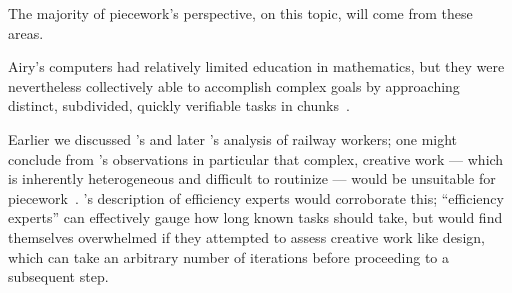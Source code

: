 \documentclass[trackingWork]{subfiles}
\begin{document}

The majority of piecework's perspective, on this topic, will come from these areas.

Airy's computers had relatively limited education in mathematics, but
they were nevertheless collectively able to accomplish complex goals by
approaching distinct, subdivided, quickly verifiable tasks in chunks~\cite{grier2013computers}.

Earlier we discussed \citeauthor{10.2307/23702539}'s and later \citeauthor{Brown01041990}'s analysis of railway workers;
one might conclude from \citeauthor{10.2307/23702539}'s observations in particular that
complex, creative work
--- which is inherently heterogeneous and difficult to routinize ---
would be unsuitable for piecework~\cite{10.2307/23702539}.
\citeauthor{Brown01041990}'s description of efficiency experts would corroborate this;
``efficiency experts'' can effectively gauge how long known tasks should take, but
would find themselves overwhelmed if they attempted to assess creative work like design,
which can take an arbitrary number of iterations before proceeding to a subsequent step.
\end{document}
